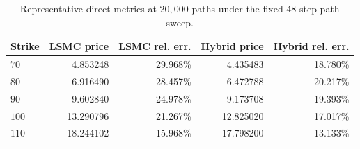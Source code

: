\begin{table}[htbp]
\centering
\caption{Representative direct metrics at $20{,}000$ paths under the fixed 48-step path sweep.}
\label{tab:bgk_r05_v0114_vp009_t1_delta05_nex12-path48-path20k}
\begin{tabular}{lrrrr}
\toprule
Strike & LSMC price & LSMC rel. err. & Hybrid price & Hybrid rel. err. \\
\midrule
$70$ & 4.853248 & 29.968\% & 4.435483 & 18.780\% \\
$80$ & 6.916490 & 28.457\% & 6.472788 & 20.217\% \\
$90$ & 9.602840 & 24.978\% & 9.173708 & 19.393\% \\
$100$ & 13.290796 & 21.267\% & 12.825020 & 17.017\% \\
$110$ & 18.244102 & 15.968\% & 17.798200 & 13.133\% \\
\bottomrule
\end{tabular}
\end{table}
